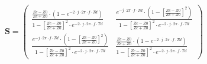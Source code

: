 \[ \mathbf{S} = \left(\begin{array}{cc}  \frac{  \frac{ Zc-Z0 }{ Zc +
Z0 } \cdot \left( 1 - e^{-2 \cdot  j \cdot 2 \pi \cdot f \cdot Td }
\right) }{ 1 - \left[  \frac{ Zc-Z0 }{ Zc + Z0 } \right]^2 \cdot e^{-2
\cdot  j \cdot 2 \pi \cdot f \cdot Td }  } &  \frac{ e^{- j \cdot 2
\pi \cdot f \cdot Td} \cdot \left( 1 - \left[  \frac{ Zc-Z0 }{ Zc + Z0
} \right] ^2 \right) }{ 1 - \left[  \frac{ Zc-Z0 }{ Zc + Z0 }
\right]^2 \cdot e^{-2 \cdot  j \cdot 2 \pi \cdot f \cdot Td }  }  \\
\frac{ e^{- j \cdot 2 \pi \cdot f \cdot Td} \cdot \left( 1 - \left[
\frac{ Zc-Z0 }{ Zc + Z0 } \right] ^2 \right) }{ 1 - \left[  \frac{
Zc-Z0 }{ Zc + Z0 } \right]^2 \cdot e^{-2 \cdot  j \cdot 2 \pi \cdot f
\cdot Td }  }  &  \frac{  \frac{ Zc-Z0 }{ Zc + Z0 } \cdot \left( 1 -
e^{-2 \cdot  j \cdot 2 \pi \cdot f \cdot Td }  \right) }{ 1 - \left[
\frac{ Zc-Z0 }{ Zc + Z0 } \right]^2 \cdot e^{-2 \cdot  j \cdot 2 \pi
\cdot f \cdot Td }  } \end{array}\right) \]
